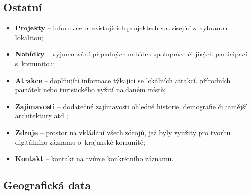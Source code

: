 \hypertarget{ostatnuxed}{%
\subsection{Ostatní}\label{ostatnuxed}}

\begin{itemize}
\tightlist
\item
  \textbf{Projekty} -- informace o~existujících projektech související s~vybranou lokalitou;
\item
  \textbf{Nabídky} -- vyjmenování případných nabídek spolupráce či jiných participací s~komunitou;
\item
  \textbf{Atrakce} -- doplňující informace týkající se lokálních atrakcí, přírodních památek nebo turistického vyžití na daném místě;
\item
  \textbf{Zajímavosti} -- dodatečné zajímavosti ohledně historie, demografie či tamější architektury atd.;
\item
  \textbf{Zdroje} -- prostor na vkládání všech zdrojů, jež byly využity pro tvorbu digitálního záznamu o~krajanské komunitě;
\item
  \textbf{Kontakt} -- kontakt na tvůrce konkrétního záznamu.
\end{itemize}

\hypertarget{geografickuxe1-data}{%
\subsection{Geografická data}\label{geografickuxe1-data}}

